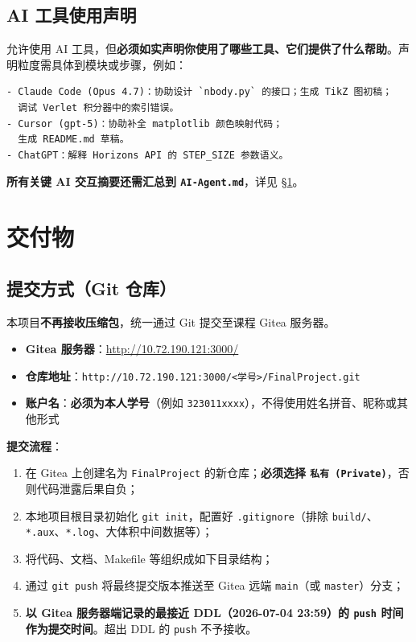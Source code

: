 \documentclass[11pt,a4paper]{ctexart}
\begin{document}
\subsection{AI 工具使用声明}

允许使用 AI 工具，但\textbf{必须如实声明你使用了哪些工具、它们提供了什么帮助}。声明粒度需具体到模块或步骤，例如：

\begin{lstlisting}
- Claude Code (Opus 4.7)：协助设计 `nbody.py` 的接口；生成 TikZ 图初稿；
  调试 Verlet 积分器中的索引错误。
- Cursor (gpt-5)：协助补全 matplotlib 颜色映射代码；
  生成 README.md 草稿。
- ChatGPT：解释 Horizons API 的 STEP_SIZE 参数语义。
\end{lstlisting}

\textbf{所有关键 AI 交互摘要还需汇总到 \texttt{AI-Agent.md}}，详见 §\ref{sec:deliverables}。

\section{交付物}\label{sec:deliverables}

\subsection{提交方式（Git 仓库）}

本项目\textbf{不再接收压缩包}，统一通过 Git 提交至课程 Gitea 服务器。

\begin{notebox}[仓库地址]
\begin{itemize}[leftmargin=*,nosep]
    \item \textbf{Gitea 服务器}：\url{http://10.72.190.121:3000/}
    \item \textbf{仓库地址}：\texttt{http://10.72.190.121:3000/<学号>/FinalProject.git}
    \item \textbf{账户名}：\textbf{必须为本人学号}（例如 \texttt{323011xxxx}），不得使用姓名拼音、昵称或其他形式
\end{itemize}
\end{notebox}

\textbf{提交流程}：

\begin{enumerate}[leftmargin=*,nosep]
    \item 在 Gitea 上创建名为 \texttt{FinalProject} 的新仓库；\textbf{必须选择 \texttt{私有 (Private)}}，否则代码泄露后果自负；
    \item 本地项目根目录初始化 \texttt{git init}，配置好 \texttt{.gitignore}（排除 \texttt{build/}、\texttt{*.aux}、\texttt{*.log}、大体积中间数据等）；
    \item 将代码、文档、Makefile 等组织成如下目录结构；
    \item 通过 \texttt{git push} 将最终提交版本推送至 Gitea 远端 \texttt{main}（或 \texttt{master}）分支；
    \item \textbf{以 Gitea 服务器端记录的最接近 DDL（2026-07-04 23:59）的 \texttt{push} 时间作为提交时间}。超出 DDL 的 \texttt{push} 不予接收。
\end{enumerate}
\end{document}
